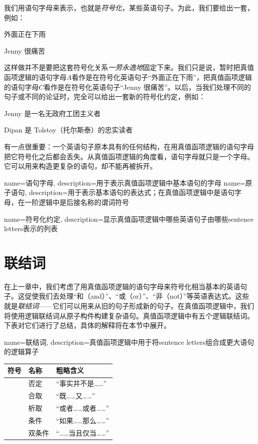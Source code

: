 我们用语句字母来表示，也就是\emph{符号化}，某些英语句子。为此，我们要给出一套，例如：


\begin{ekey}
		\item[A] 外面正在下雨
		\item[C] Jenny 很痛苦
	\end{ekey}


这样做并不是要把这套符号化关系\emph{一劳永逸地}固定下来。我们只是说，暂时把真值函项逻辑的语句字母$A$看作是在符号化英语句子“外面正在下雨”，把真值函项逻辑的语句字母$C$看作是在符号化英语句子“Jenny 很痛苦”。以后，当我们处理不同的句子或不同的论证时，完全可以给出一套新的符号化约定，例如：


\begin{ekey}
		\item[A] Jenny 是一名无政府工团主义者
		\item[C] Dipan 是 Tolstoy（托尔斯泰）的忠实读者
	\end{ekey}


有一点很重要：一个英语句子原本具有的任何结构，在用真值函项逻辑的语句字母把它符号化之后都会丢失。从真值函项逻辑的角度看，语句字母就只是一个字母。它可以用来构造更复杂的语句，却不能再被拆开。

{
name=语句字母,
description={用于表示真值函项逻辑中基本语句的字母}
}
{
name=原子语句,
description={用于表示基本语句的表达式；在真值函项逻辑中是语句字母，在一阶逻辑中是后接名称的谓词符号}
}

{
name=符号化约定,
description={显示真值函项逻辑中哪些英语句子由哪些\glspl{sentence letter}表示的列表}
}

\chapter{联结词}
\label{s:TFLConnectives}

在上一章中，我们考虑了用真值函项逻辑的语句字母来符号化相当基本的英语句子。这促使我们去处理“和（and）”、“或（or）”、“非（not）”等英语表达式。这些就是\emph{联结词}——它们可以用来从旧的句子形成新的句子。在真值函项逻辑中，我们将使用逻辑联结词从原子构件构建复杂语句。真值函项逻辑中有五个逻辑联结词。下表对它们进行了总结，具体的解释将在本节中展开。

{
name=联结词,
description={真值函项逻辑中用于将\glspl{sentence letter}组合成更大语句的逻辑算子}
}


\begin{table}[h]
	\center
	\begin{tabular}{l l l}

	\textbf{符号}&\textbf{名称}&\textbf{粗略含义}\\
	\hline
	\enot&否定&“事实并不是……”\\
	\eand&合取&“既……又……”\\
	\eor&析取&“或者……或者……”\\
	\eif&条件&“如果……那么……”\\
	\eiff&双条件&“……当且仅当……”\\

	\end{tabular}
	\end{table}

